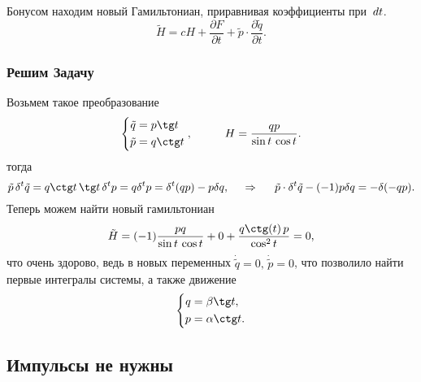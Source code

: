 \noindent
Бонусом находим новый Гамильтониан, приравнивая коэффициенты при $\, d t$. 
\begin{equation*}
    \tilde{H} = c H + \frac{\partial F}{\partial t} + \tilde{p} \cdot \frac{\partial \tilde{q}}{\partial t}.
\end{equation*}

\subsubsection*{Решим Задачу}
Возьмем такое преобразование
\begin{equation*}
    \left\{\begin{aligned}
        \tilde{q} &= p \tg t \\
        \tilde{p} &= q \ctg t \\
    \end{aligned}\right.
    ,
    \hspace{10 mm}
    H = \frac{qp}{\sin t \, \cos t}.
\end{equation*}
тогда
\begin{equation*}
    \tilde{p} \, \delta^t \tilde{q} = q \ctg t \, \tg t \, \delta^t p = q \delta^t p = \delta^t (qp) - p \delta q,
    \hspace{0.5cm} \Rightarrow \hspace{0.5cm}
    \tilde{p} \cdot \delta^t \tilde{q} - (-1) p \delta q = - \delta (-qp).
\end{equation*}
Теперь можем найти новый гамильтониан
\begin{equation*}
    \tilde{H} = (-1) \frac{pq}{\sin t \, \cos t} + 0 + \frac{q \ctg (t)\,  p}{\cos^2 t} = 0,
\end{equation*}
что очень здорово, ведь в новых переменных $\dot{\tilde{q}} = 0, \, \dot{\tilde{p}} = 0$, что позволило найти первые интегралы системы, а также движение
\begin{equation*}
    \left\{\begin{aligned}
        q &= \beta \tg t, \\
        p &= \alpha \ctg t. \\
    \end{aligned}\right.
\end{equation*}


\subsection{Импульсы не нужны}

